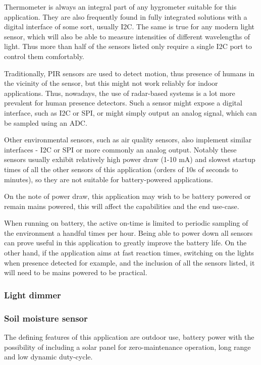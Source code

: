 Thermometer is always an integral part of any hygrometer suitable for this application. They are also frequently found in fully integrated solutions with a digital interface of some sort, usually I2C. The same is true for any modern light sensor, which will also be able to measure intensities of different wavelengths of light. Thus more than half of the sensors listed only require a single I2C port to control them comfortably.

Traditionally, PIR sensors are used to detect motion, thus presence of humans in the vicinity of the sensor, but this might not work reliably for indoor applications. Thus, nowadays, the use of radar-based systems is a lot more prevalent for human presence detectors. Such a sensor might expose a digital interface, such as I2C or SPI, or might simply output an analog signal, which can be sampled using an ADC.

Other environmental sensors, such as air quality sensors, also implement similar interfaces - I2C or SPI or more commonly an analog output. Notably these sensors usually exhibit relatively high power draw (1-10 mA) and slowest startup times of all the other sensors of this application (orders of 10s of seconds to minutes), so they are not suitable for battery-powered applications.

On the note of power draw, this application may wish to be battery powered or remain mains powered, this will affect the capabilities and the end use-case. 

When running on battery, the active on-time is limited to periodic sampling of the environment a handful times per hour. Being able to power down all sensors can prove useful in this application to greatly improve the battery life. On the other hand, if the application aims at fast reaction times, switching on the lights when presence detected for example, and the inclusion of all the sensors listed, it will need to be mains powered to be practical.

\subsubsection{Light dimmer}

\subsubsection{Soil moisture sensor}
The defining features of this application are outdoor use, battery power with the possibility of including a solar panel for zero-maintenance operation, long range and low dynamic duty-cycle.

